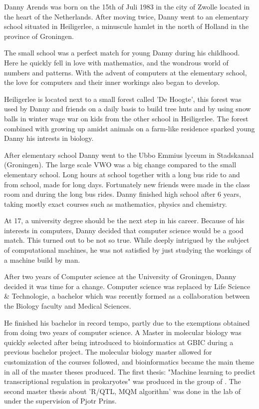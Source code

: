 Danny Arends was born on the 15th of Juli 1983 in the city of Zwolle located in the heart 
of the Netherlands. After moving twice, Danny went to an elementary school situated in 
Heiligerlee, a minuscule hamlet in the north of Holland in the province of Groningen. 

The small school was a perfect match for young Danny during his childhood. Here he quickly 
fell in love with mathematics, and the wondrous world of numbers and patterns. With the 
advent of computers at the elementary school, the love for computers and their inner 
workings also began to develop.

Heiligerlee is located next to a small forest called 'De Hoogte', this forest was used 
by Danny and friends on a daily basis to build tree huts and by using snow balls in winter 
wage war on kids from the other school in Heiligerlee. The forest combined with growing up 
amidst animals on a farm-like residence sparked young Danny his intrests in biology.

After elementary school Danny went to the Ubbo Emmius lyceum in Stadskanaal (Groningen). 
The large scale VWO was a big change compared to the small elementary school. Long hours at school 
together with a long bus ride to and from school, made for long days. Fortunately new 
friends were made in the class room and during the long bus rides. Danny finished high 
school after 6 years, taking mostly exact courses such as mathematics, physics and chemistry.

At 17, a university degree should be the next step in his career. Because of his interests 
in computers, Danny decided that computer science would be a good match. This turned out 
to be not so true. While deeply intrigued by the subject of computational machines, he 
was not satisfied by just studying the workings of a machine build by man.

After two years of Computer science at the University of Groningen, Danny decided it was time 
for a change. Computer science was replaced by Life Science \& Technologie, a bachelor which 
was recently formed as a collaboration between the Biology faculty and Medical Sciences.

He finished his bachelor in record tempo, partly due to the exemptions obtained from 
doing two years of computer science. A Master in molecular biology was quickly selected after
being introduced to bioinformatics at GBIC during a previous bachelor project. The molecular 
biology master allowed for customization of the courses followed, and bioinformatics became the main 
theme in all of the master theses produced. The first thesis: "Machine learning to predict 
transcriptional regulation in prokaryotes" was produced in the group of . 
The second master thesis about 'R/QTL, MQM algorithm' was done in the lab of  
under the supervision of Pjotr Prins.

